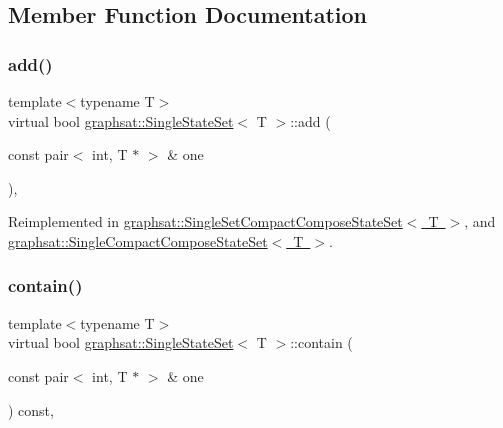 \subsection{Member Function Documentation}
\mbox{\label{classgraphsat_1_1_single_state_set_a5fb0f789a7429ca9ad94003f4e639570}} 
\subsubsection{\texorpdfstring{add()}{add()}}
{\footnotesize\ttfamily template$<$typename T$>$ \\
virtual bool \mbox{\hyperlink{classgraphsat_1_1_single_state_set}{graphsat\+::\+Single\+State\+Set}}$<$ T $>$\+::add (\begin{DoxyParamCaption}\item[{const pair$<$ int, T $\ast$ $>$ \&}]{one }\end{DoxyParamCaption})\hspace{0.3cm}{\ttfamily [inline]}, {\ttfamily [virtual]}}



Reimplemented in \mbox{\hyperlink{classgraphsat_1_1_single_set_compact_compose_state_set_a51dc5d12b4a54e6b8d724d0496367b7f}{graphsat\+::\+Single\+Set\+Compact\+Compose\+State\+Set$<$ T $>$}}, and \mbox{\hyperlink{classgraphsat_1_1_single_compact_compose_state_set_a7f5aa3bcf4d884372d99fe33402a4f0a}{graphsat\+::\+Single\+Compact\+Compose\+State\+Set$<$ T $>$}}.

\mbox{\label{classgraphsat_1_1_single_state_set_a633187e0b872537595ad313a458b87e1}} 
\subsubsection{\texorpdfstring{contain()}{contain()}}
{\footnotesize\ttfamily template$<$typename T$>$ \\
virtual bool \mbox{\hyperlink{classgraphsat_1_1_single_state_set}{graphsat\+::\+Single\+State\+Set}}$<$ T $>$\+::contain (\begin{DoxyParamCaption}\item[{const pair$<$ int, T $\ast$ $>$ \&}]{one }\end{DoxyParamCaption}) const\hspace{0.3cm}{\ttfamily [inline]}, {\ttfamily [virtual]}}



